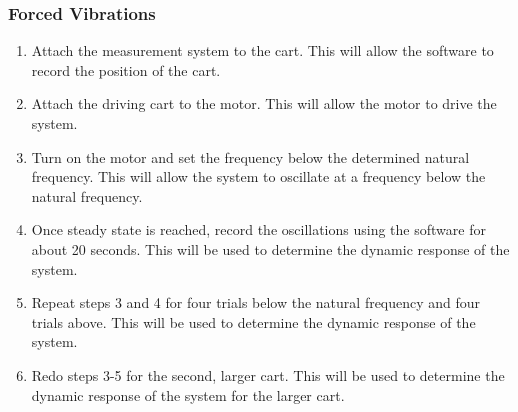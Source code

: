 \subsubsection{Forced Vibrations}
\begin{enumerate}
    \item Attach the measurement system to the cart. This will allow the software to record the position of the cart.
    \item Attach the driving cart to the motor. This will allow the motor to drive the system.
    \item Turn on the motor and set the frequency below the determined natural frequency. This will allow the system to oscillate at a frequency below the natural frequency.
    \item Once steady state is reached, record the oscillations using the software for about 20 seconds. This will be used to determine the dynamic response of the system.
    \item Repeat steps 3 and 4 for four trials below the natural frequency and four trials above. This will be used to determine the dynamic response of the system.
    \item Redo steps 3-5 for the second, larger cart. This will be used to determine the dynamic response of the system for the larger cart.
\end{enumerate}
